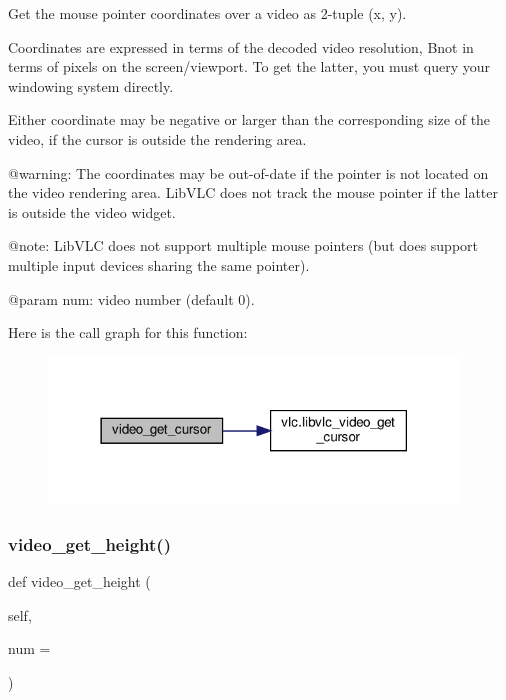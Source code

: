 \begin{DoxyVerb}Get the mouse pointer coordinates over a video as 2-tuple (x, y).

Coordinates are expressed in terms of the decoded video resolution,
B{not} in terms of pixels on the screen/viewport.  To get the
latter, you must query your windowing system directly.

Either coordinate may be negative or larger than the corresponding
size of the video, if the cursor is outside the rendering area.

@warning: The coordinates may be out-of-date if the pointer is not
located on the video rendering area.  LibVLC does not track the
mouse pointer if the latter is outside the video widget.

@note: LibVLC does not support multiple mouse pointers (but does
support multiple input devices sharing the same pointer).

@param num: video number (default 0).
\end{DoxyVerb}
 Here is the call graph for this function\+:
\nopagebreak
\begin{figure}[H]
\begin{center}
\leavevmode
\includegraphics[width=309pt]{classvlc_1_1_media_player_ab7dafcaa92a52013fbd88fd5d8d45588_cgraph}
\end{center}
\end{figure}
\mbox{\label{classvlc_1_1_media_player_a282ff18f2701edbdab0cb4638f9439ea}} 
\subsubsection{\texorpdfstring{video\+\_\+get\+\_\+height()}{video\_get\_height()}}
{\footnotesize\ttfamily def video\+\_\+get\+\_\+height (\begin{DoxyParamCaption}\item[{}]{self,  }\item[{}]{num = {} }\end{DoxyParamCaption})}

